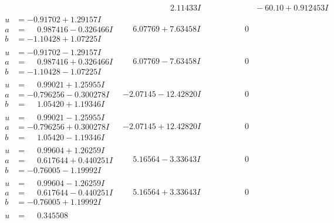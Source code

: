 \documentclass[1p]{elsarticle_modified}
\theoremstyle{definition}
\begin{document}
$$\begin{array}{c|c|c}
 & \phantom{-0.000000 -}2.11433 I & \phantom{-0.000000 -}     -6
0. 10   + 0.912453 I \\ \hline\begin{aligned}
u &= -0.91702 + 1.29157 I \\
a &= \phantom{-}0.987416 - 0.326466 I \\
b &= -1.10428 + 1.07225 I\end{aligned}
 & \phantom{-}6.07769 + 7.63458 I & \phantom{-0.000000 } 0 \\ \hline\begin{aligned}
u &= -0.91702 - 1.29157 I \\
a &= \phantom{-}0.987416 + 0.326466 I \\
b &= -1.10428 - 1.07225 I\end{aligned}
 & \phantom{-}6.07769 - 7.63458 I & \phantom{-0.000000 } 0 \\ \hline\begin{aligned}
u &= \phantom{-}0.99021 + 1.25955 I \\
a &= -0.796256 - 0.300278 I \\
b &= \phantom{-}1.05420 + 1.19346 I\end{aligned}
 & -2.07145 - 12.42820 I & \phantom{-0.000000 } 0 \\ \hline\begin{aligned}
u &= \phantom{-}0.99021 - 1.25955 I \\
a &= -0.796256 + 0.300278 I \\
b &= \phantom{-}1.05420 - 1.19346 I\end{aligned}
 & -2.07145 + 12.42820 I & \phantom{-0.000000 } 0 \\ \hline\begin{aligned}
u &= \phantom{-}0.99604 + 1.26259 I \\
a &= \phantom{-}0.617644 + 0.440251 I \\
b &= -0.76005 - 1.19992 I\end{aligned}
 & \phantom{-}5.16564 - 3.33643 I & \phantom{-0.000000 } 0 \\ \hline\begin{aligned}
u &= \phantom{-}0.99604 - 1.26259 I \\
a &= \phantom{-}0.617644 - 0.440251 I \\
b &= -0.76005 + 1.19992 I\end{aligned}
 & \phantom{-}5.16564 + 3.33643 I & \phantom{-0.000000 } 0 \\ \hline\begin{aligned}
u &= \phantom{-}0.345508\phantom{ +0.000000I} \\

\end{aligned}
\end{array}$$
\end{document}
